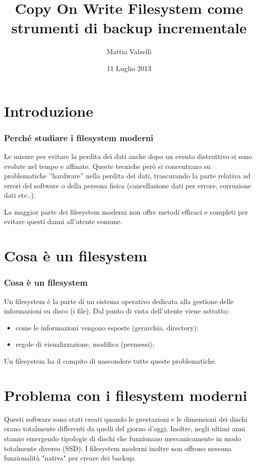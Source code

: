 \documentclass{beamer}
\title[COW Filesystem]{Copy On Write Filesystem come strumenti di backup incrementale}
\author[Mattia Valzelli]{Mattia Valzelli}
\institute[Univr]{Universit\`{a} degli studi di Verona}
\date{11 Luglio 2013}
\begin{document}
\begin{frame}
\titlepage
\end{frame}
\section{Introduzione} %
\begin{frame} %
\frametitle{Perch\'e studiare i filesystem moderni} %
Le misure per evitare la perdita dei dati anche dopo un evento distruttivo si sono evolute nel tempo e affinate. Queste tecniche per\`o si concentrano su problematiche ”hardware” nella perdita dei dati, trascurando la parte relativa ad errori del software o della persona fisica (cancellazione dati per errore, corruzione dati etc..).
\end{frame}

\begin{frame}
La maggior parte dei filesystem moderni non offre metodi efficaci e completi per evitare questi danni all'utente comune.
\end{frame}

\section{Cosa \`e un filesystem}
\begin{frame}
\frametitle{Cosa \`e un filesystem}
Un filesystem \`e la parte di un sistema operativo dedicata alla gestione delle informazioni su disco (i file). 
\newline
Dal punto di vista dell'utente viene astratto:
\begin{itemize}
\item come le informazioni vengono esposte (gerarchia, directory);
\item regole di visualizzazione, modifica (permessi);
\end{itemize}
Un filesystem ha il compito di nascondere tutte queste problematiche.
\end{frame}

\section{Problema con i filesystem moderni}
\begin{frame}
Questi software sono stati creati quando le prestazioni e le dimensioni dei dischi erano totalmente differenti da quelli del giorno d'oggi. Inoltre, negli ultimi anni stanno emergendo tipologie di dischi che funzionano meccanicamente in modo totalmente diverso (SSD).
\newline
I filesystem moderni inoltre non offrono nessuna funzionalit\`a "nativa" per creare dei backup.
\end{frame}
\end{document}
